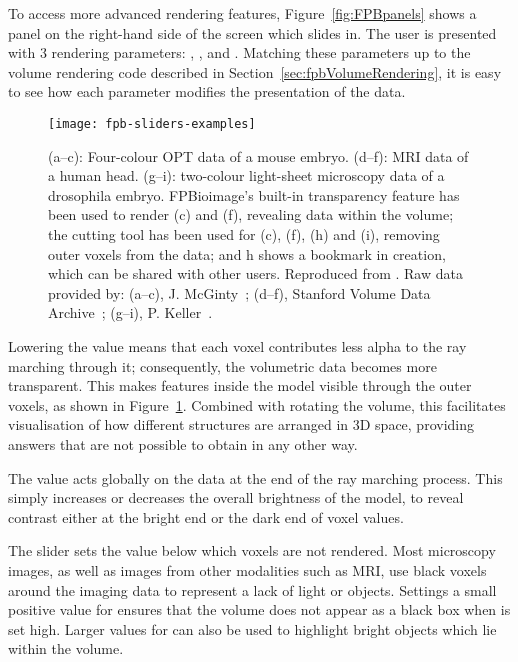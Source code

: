 To access more advanced rendering features, Figure~\ref{fig:FPBpanels} shows a panel on the right-hand side of the screen which slides in.
The user is presented with 3 rendering parameters: , , and .
Matching these parameters up to the volume rendering code described in Section~\ref{sec:fpbVolumeRendering}, it is easy to see how each parameter modifies the presentation of the data.

\begin{figure}[htbp!]
\centering
\texttt{[image: fpb-sliders-examples]}
\caption[FPBioimage: Advanced rendering features provide unique views of volumetric data]{(a–c): Four-colour OPT data of a mouse embryo. (d–f): MRI data of a human head. (g–i): two-colour light-sheet microscopy data of a drosophila embryo. FPBioimage's built-in transparency feature has been used to render (c) and (f), revealing data within the volume; the cutting tool has been used for (c), (f), (h) and (i), removing outer voxels from the data; and h shows a bookmark in creation, which can be shared with other users. Reproduced from \cite{fantham2017new}. Raw data provided by: (a–c), J. McGinty~\cite{sharpe2002optical}; (d–f), Stanford Volume Data Archive~\cite{levoy1988volume}; (g–i), P. Keller~\cite{chhetri2015whole}. }
\label{fig:fpbRendering}
\end{figure}

Lowering the  value means that each voxel contributes less alpha to the ray marching through it; consequently, the volumetric data becomes more transparent.
This makes features inside the model visible through the outer voxels, as shown in Figure~\ref{fig:fpbRendering}.
Combined with rotating the volume, this facilitates visualisation of how different structures are arranged in 3D space, providing answers that are not possible to obtain in any other way.

The  value acts globally on the data at the end of the ray marching process.
This simply increases or decreases the overall brightness of the model, to reveal contrast either at the bright end or the dark end of voxel values. %

The  slider sets the value below which voxels are not rendered.
Most microscopy images, as well as images from other modalities such as MRI, use black voxels around the imaging data to represent a lack of light or objects.
Settings a small positive value for  ensures that the volume does not appear as a black box when  is set high.
Larger values for  can also be used to highlight bright objects which lie within the volume.

